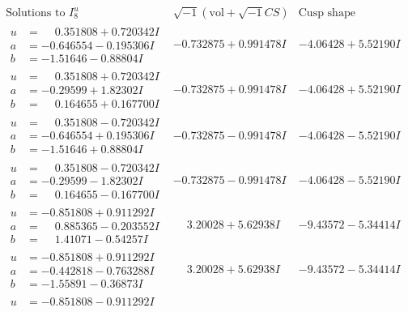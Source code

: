 \documentclass[1p]{elsarticle_modified}
\theoremstyle{definition}
\newcommand{\I}{\sqrt{-1}}
\begin{document}
$$\begin{array}{c|c|c}  
\text{Solutions to }I^u_{8}& \I (\text{vol} + \sqrt{-1}CS) & \text{Cusp shape}\\
 \hline 
\begin{aligned}
u &= \phantom{-}0.351808 + 0.720342 I \\
a &= -0.646554 - 0.195306 I \\
b &= -1.51646 - 0.88804 I\end{aligned}
 & -0.732875 + 0.991478 I & -4.06428 + 5.52190 I \\ \hline\begin{aligned}
u &= \phantom{-}0.351808 + 0.720342 I \\
a &= -0.29599 + 1.82302 I \\
b &= \phantom{-}0.164655 + 0.167700 I\end{aligned}
 & -0.732875 + 0.991478 I & -4.06428 + 5.52190 I \\ \hline\begin{aligned}
u &= \phantom{-}0.351808 - 0.720342 I \\
a &= -0.646554 + 0.195306 I \\
b &= -1.51646 + 0.88804 I\end{aligned}
 & -0.732875 - 0.991478 I & -4.06428 - 5.52190 I \\ \hline\begin{aligned}
u &= \phantom{-}0.351808 - 0.720342 I \\
a &= -0.29599 - 1.82302 I \\
b &= \phantom{-}0.164655 - 0.167700 I\end{aligned}
 & -0.732875 - 0.991478 I & -4.06428 - 5.52190 I \\ \hline\begin{aligned}
u &= -0.851808 + 0.911292 I \\
a &= \phantom{-}0.885365 - 0.203552 I \\
b &= \phantom{-}1.41071 - 0.54257 I\end{aligned}
 & \phantom{-}3.20028 + 5.62938 I & -9.43572 - 5.34414 I \\ \hline\begin{aligned}
u &= -0.851808 + 0.911292 I \\
a &= -0.442818 - 0.763288 I \\
b &= -1.55891 - 0.36873 I\end{aligned}
 & \phantom{-}3.20028 + 5.62938 I & -9.43572 - 5.34414 I \\ \hline\begin{aligned}
u &= -0.851808 - 0.911292 I \\

\end{aligned}
\end{array}$$
\end{document}
